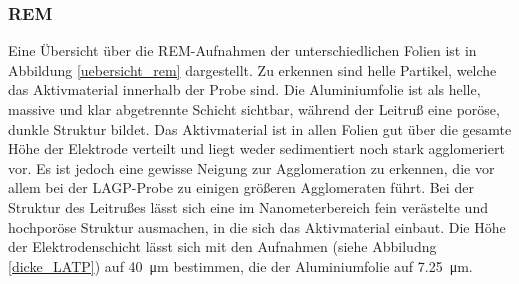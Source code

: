 \documentclass[a4paper, 11pt, headsepline,footsepline,twoside,abstract]{scrbook}
\begin{document}
\subsubsection{REM}
Eine Übersicht  über die REM-Aufnahmen der unterschiedlichen Folien ist in Abbildung \ref{uebersicht_rem} dargestellt. Zu erkennen sind helle Partikel, welche das Aktivmaterial innerhalb der Probe sind. Die Aluminiumfolie ist als helle, massive  und klar abgetrennte Schicht sichtbar, während der Leitruß eine poröse, dunkle Struktur bildet. Das Aktivmaterial ist in allen Folien gut über die gesamte Höhe der Elektrode verteilt und liegt weder sedimentiert noch stark agglomeriert vor. Es ist jedoch eine gewisse Neigung zur Agglomeration zu erkennen, die vor allem bei der LAGP-Probe zu einigen größeren Agglomeraten führt. Bei der Struktur des Leitrußes lässt sich eine im Nanometerbereich fein verästelte und hochporöse Struktur ausmachen, in die sich das Aktivmaterial einbaut. Die Höhe der Elektrodenschicht lässt sich mit den Aufnahmen (siehe Abbiludng \ref{dicke_LATP}) auf \SI{40}{\micro\metre} bestimmen, die der Aluminiumfolie auf \SI{7.25}{\micro\metre}.
\end{document}
